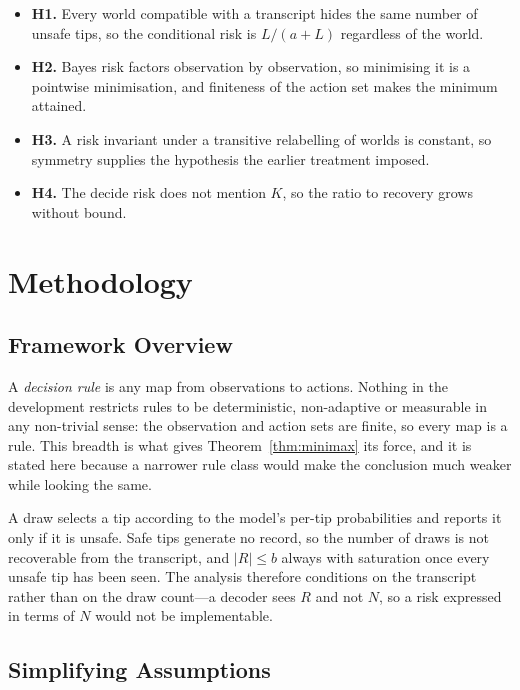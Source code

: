 \begin{itemize}
\item \textbf{H1.} Every world compatible with a transcript hides the same number of unsafe
tips, so the conditional risk is $L/(a+L)$ regardless of the world.
\item \textbf{H2.} Bayes risk factors observation by observation, so minimising it is a
pointwise minimisation, and finiteness of the action set makes the minimum attained.
\item \textbf{H3.} A risk invariant under a transitive relabelling of worlds is constant, so
symmetry supplies the hypothesis the earlier treatment imposed.
\item \textbf{H4.} The decide risk does not mention $K$, so the ratio to recovery grows
without bound.
\end{itemize}

\section{Methodology}
\label{sec:setting}

\subsection{Framework Overview}

A \emph{decision rule} is any map from observations to actions. Nothing in the development
restricts rules to be deterministic, non-adaptive or measurable in any non-trivial sense: the
observation and action sets are finite, so every map is a rule. This breadth is what gives
Theorem~\ref{thm:minimax} its force, and it is stated here because a narrower rule class would
make the conclusion much weaker while looking the same.

A draw selects a tip according to the model's per-tip probabilities and reports it only if it
is unsafe. Safe tips generate no record, so the number of draws is not recoverable from the
transcript, and $|R|\le b$ always with saturation once every unsafe tip has been seen. The
analysis therefore conditions on the transcript rather than on the draw count---a decoder sees
$R$ and not $N$, so a risk expressed in terms of $N$ would not be implementable.

\subsection{Simplifying Assumptions}

